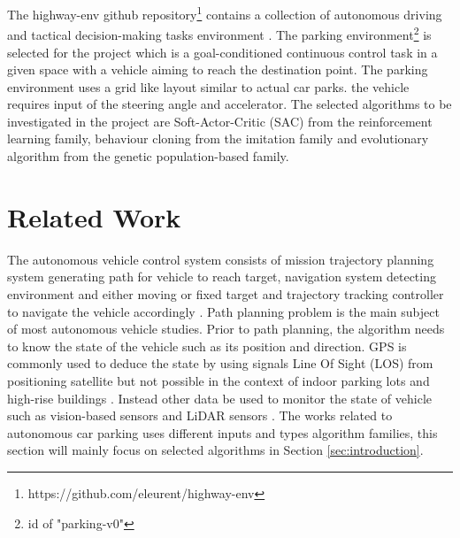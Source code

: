 \documentclass{svproc}
\begin{document}
The highway-env github repository\footnote{https://github.com/eleurent/highway-env} contains a collection of autonomous driving and tactical decision-making tasks environment \cite{highway-env}. The parking environment\footnote{id of "parking-v0"} is selected for the project which is a goal-conditioned continuous control task in a given space with a vehicle aiming to reach the destination point. The parking environment uses a grid like layout similar to actual car parks. the vehicle requires input of the steering angle and accelerator. The selected algorithms to be investigated in the project are Soft-Actor-Critic (SAC) from the reinforcement learning family, behaviour cloning from the imitation family and evolutionary algorithm from the genetic population-based family.

\section{Related Work}
The autonomous vehicle control system consists of mission trajectory planning system generating path for vehicle to reach target, navigation system detecting environment and either moving or fixed target and trajectory tracking controller to navigate the vehicle accordingly \cite{lin2018path}. Path planning problem is the main subject of most autonomous vehicle studies. Prior to path planning, the algorithm needs to know the state of the vehicle such as its position and direction. GPS is commonly used to deduce the state by using signals Line Of Sight (LOS) from positioning satellite but not possible in the context of indoor parking lots \cite{correa2017autonomous} and high-rise buildings \cite{saksena2019towards}. Instead other data be used to monitor the state of vehicle such as vision-based sensors and LiDAR sensors \cite{chan2021review}. The works related to autonomous car parking uses different inputs and types algorithm families, this section will mainly focus on selected algorithms in Section \ref{sec:introduction}.

\end{document}
